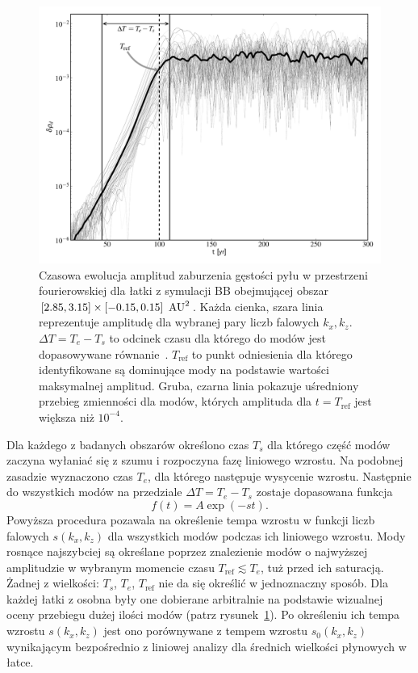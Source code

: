 \begin{figure}
  \includegraphics[width=0.98\linewidth]{figures/fig7}

  \caption{Czasowa ewolucja amplitud zaburzenia gęstości pyłu w przestrzeni
     fourierowskiej dla łatki z symulacji BB obejmującej obszar 
     $[2.85,3.15]\times[-0.15,0.15]~\hbox{$\thinspace\textrm{AU}$}^2$. Każda cienka, szara linia
     reprezentuje amplitudę dla wybranej pary liczb falowych $k_x, k_z$.
     $\Delta T = T_e - T_s$ to odcinek czasu dla którego do modów jest
     dopasowywane równanie~. $T_{\textrm{ref}}$ to punkt
     odniesienia dla którego identyfikowane są dominujące mody na podstawie
     wartości maksymalnej amplitud. Gruba, czarna linia pokazuje uśredniony
     przebieg zmienności dla modów, których amplituda dla $t = T_{\textrm{ref}}$
     jest większa niż $10^{-4}$.} 
   \label{fig7} 
\end{figure}

Dla każdego z badanych obszarów określono czas $T_s$ dla którego część modów
zaczyna wyłaniać się z szumu i rozpoczyna fazę liniowego wzrostu. Na
podobnej zasadzie wyznaczono czas $T_e$, dla którego następuje wysycenie
wzrostu. Następnie do wszystkich modów na przedziale $\Delta T = T_e - T_s$
zostaje dopasowana funkcja
%
\begin{equation}
   f(t) = A\exp\left(-s t\right).
   \label{eq:fit}
\end{equation}
%
Powyższa procedura pozawala na określenie tempa wzrostu w funkcji liczb falowych
$s(k_x, k_z)$ dla wszystkich modów podczas ich liniowego wzrostu. Mody rosnące
najszybciej są określane poprzez znalezienie modów o najwyższej amplitudzie w
wybranym momencie czasu $T_{\textrm{ref}} \lesssim T_e$, tuż przed ich
saturacją. Żadnej z wielkości: $T_s$, $T_e$, $T_{\textrm{ref}}$ nie da się
określić w jednoznaczny sposób. Dla każdej łatki z osobna były one dobierane
arbitralnie na podstawie wizualnej oceny przebiegu dużej ilości modów (patrz
rysunek~\ref{fig7}).  Po określeniu ich tempa wzrostu $s(k_x, k_z)$ jest ono
porównywane z tempem wzrostu $s_0(k_x, k_z)$ wynikającym bezpośrednio z liniowej
analizy dla średnich wielkości płynowych w łatce.

